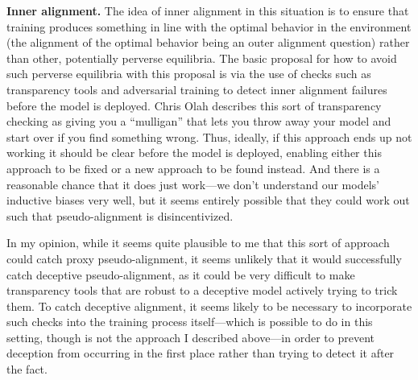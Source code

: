 \documentclass[
  onecolumn,
  natbib,
]{miri-tech-article}
\begin{document}
\textbf{Inner alignment.} The idea of inner alignment in this situation is to ensure that training produces something in line with the optimal behavior in the environment (the alignment of the optimal behavior being an outer alignment question) rather than other, potentially perverse equilibria. The basic proposal for how to avoid such perverse equilibria with this proposal is via the use of checks such as transparency tools and adversarial training to detect inner alignment failures before the model is deployed. Chris Olah describes\cite{TODO: cite https://www.alignmentforum.org/posts/X2i9dQQK3gETCyqh2/chris-olah-s-views-on-agi-safety} this sort of transparency checking as giving you a ``mulligan'' that lets you throw away your model and start over if you find something wrong. Thus, ideally, if this approach ends up not working it should be clear before the model is deployed, enabling either this approach to be fixed or a new approach to be found instead. And there is a reasonable chance that it does just work---we don't understand our models' inductive biases very well, but it seems entirely possible that they could work out such that pseudo-alignment\cite{TODO: cite https://www.alignmentforum.org/s/r9tYkB2a8Fp4DN8yB/p/FkgsxrGf3QxhfLWHG} is disincentivized.

In my opinion, while it seems quite plausible to me that this sort of approach could catch proxy pseudo-alignment\cite{TODO: cite https://www.alignmentforum.org/posts/pL56xPoniLvtMDQ4J/the-inner-alignment-problem}, it seems unlikely that it would successfully catch deceptive pseudo-alignment\cite{TODO: cite https://www.alignmentforum.org/posts/zthDPAjh9w6Ytbeks/deceptive-alignment}, as it could be very difficult to make transparency tools that are robust to a deceptive model actively trying to trick them. To catch deceptive alignment, it seems likely to be necessary to incorporate such checks into the training process itself---which is possible to do in this setting, though is not the approach I described above---in order to prevent deception from occurring in the first place rather than trying to detect it after the fact.
\end{document}
